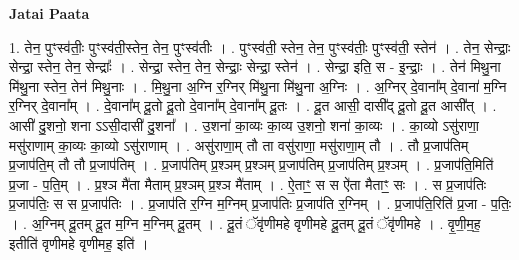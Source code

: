 \documentclass[17pt]{extarticle}
\begin{document}
\textbf{Jatai Paata} \newline

1. तेन॒ पुꣳस्व॑तीः॒ पुꣳस्व॑ती॒स्तेन॒ तेन॒ पुꣳस्व॑तीः । . पुꣳस्व॑ती॒ स्तेन॒ तेन॒ पुꣳस्व॑तीः॒ पुꣳस्व॑ती॒ स्तेन॑ । . तेन॒ सेन्द्राः॒ सेन्द्रा॒ स्तेन॒ तेन॒ सेन्द्राः᳚ । . सेन्द्रा॒ स्तेन॒ तेन॒ सेन्द्राः॒ सेन्द्रा॒ स्तेन॑ । . सेन्द्रा॒ इति॒ स - इ॒न्द्राः॒ । . तेन॑ मिथु॒ना मि॑थु॒ना स्तेन॒ तेन॑ मिथु॒नाः । . मि॒थु॒ना अ॒ग्नि र॒ग्निर् मि॑थु॒ना मि॑थु॒ना अ॒ग्निः । . अ॒ग्निर् दे॒वाना᳚म् दे॒वाना॑ म॒ग्नि र॒ग्निर् दे॒वाना᳚म् । . दे॒वाना᳚म् दू॒तो दू॒तो दे॒वाना᳚म् दे॒वाना᳚म् दू॒तः । . दू॒त आसी॒ दासी᳚द् दू॒तो दू॒त आसी᳚त् । . आसी॑ दु॒शनो॒ शना ऽऽसी॒दासी॑ दु॒शना᳚ । . उ॒शना॑ का॒व्यः का॒व्य उ॒शनो॒ शना॑ का॒व्यः । . का॒व्यो ऽसु॑राणा॒ मसु॑राणाम् का॒व्यः का॒व्यो ऽसु॑राणाम् । . असु॑राणा॒म् तौ ता वसु॑राणा॒ मसु॑राणा॒म् तौ । . तौ प्र॒जाप॑तिम् प्र॒जाप॑ति॒म् तौ तौ प्र॒जाप॑तिम् । . प्र॒जाप॑तिम् प्र॒श्ञम् प्र॒श्ञम् प्र॒जाप॑तिम् प्र॒जाप॑तिम् प्र॒श्ञम् । . प्र॒जाप॑ति॒मिति॑ प्र॒जा - प॒ति॒म् । . प्र॒श्ञ मै॑ता मैताम् प्र॒श्ञम् प्र॒श्ञ मै॑ताम् । . ऐ॒ताꣳ॒॒ स स ऐ॑ता मैताꣳ॒॒ सः । . स प्र॒जाप॑तिः प्र॒जाप॑तिः॒ स स प्र॒जाप॑तिः । . प्र॒जाप॑ति र॒ग्नि म॒ग्निम् प्र॒जाप॑तिः प्र॒जाप॑ति र॒ग्निम् । . प्र॒जाप॑ति॒रिति॑ प्र॒जा - प॒तिः॒ । . अ॒ग्निम् दू॒तम् दू॒त म॒ग्नि म॒ग्निम् दू॒तम् । . दू॒तं ॅवृ॑णीमहे वृणीमहे दू॒तम् दू॒तं ॅवृ॑णीमहे । . वृ॒णी॒म॒ह॒ इतीति॑ वृणीमहे वृणीमह॒ इति॑ । \newline
\end{document}
